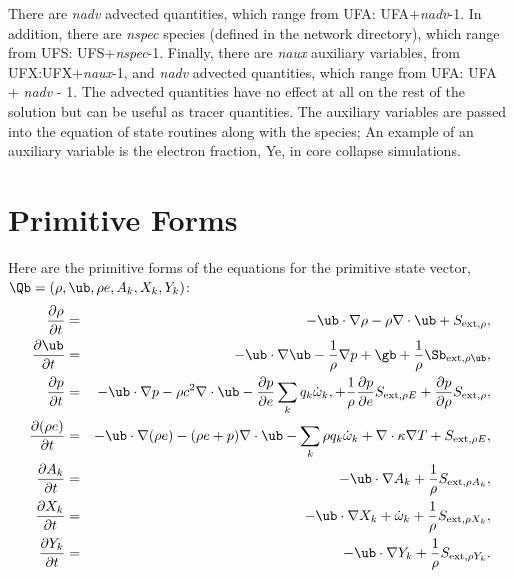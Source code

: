 There are {\it nadv} advected quantities, which range from UFA: UFA+{\it nadv}-1.
In addition, there are {\it nspec} species (defined in the network directory),  which
range from UFS: UFS+{\it nspec}-1. Finally, there are {\it naux}
auxiliary variables, from UFX:UFX+{\it naux}-1, and {\it nadv} advected
quantities, which range from UFA: UFA + {\it nadv} - 1.  
The advected quantities have no effect at all on the rest of the solution
but can be useful as tracer quantities.  The auxiliary
variables are passed into the equation of state routines along with the
species;  An example of an auxiliary variable is the electron fraction, 
Ye, in core collapse simulations.

\section{Primitive Forms}
Here are the primitive forms of the equations for the primitive state vector,
$\Qb = (\rho, \ub, \rho e, A_k, X_k, Y_k)$:
\begin{eqnarray}
\frac{\partial\rho}{\partial t} &=& -\ub\cdot\nabla\rho - \rho\nabla\cdot\ub + S_{{\rm ext},\rho}, \\
\frac{\partial\ub}{\partial t} &=& -\ub\cdot\nabla\ub - \frac{1}{\rho}\nabla p + \gb + \frac{1}{\rho}\Sb_{{\rm ext},\rho\ub}, \\
\frac{\partial p}{\partial t} &=& -\ub\cdot\nabla p - \rho c^2\nabla\cdot\ub -\frac{\partial p}{\partial e}\sum_k q_k\dot\omega_k, + \frac{1}{\rho}\frac{\partial p}{\partial e}S_{{\rm ext},\rho E} + \frac{\partial p}{\partial\rho}S_{{\rm ext},\rho}, \\
\frac{\partial(\rho e)}{\partial t} &=& - \ub\cdot\nabla(\rho e) - (\rho e+p)\nabla\cdot\ub - \sum_k \rho q_k\dot\omega_k + \nabla\cdot\kappa\nabla T + S_{{\rm ext},\rho E}, \\
\frac{\partial A_k}{\partial t} &=& -\ub\cdot\nabla A_k + \frac{1}{\rho}S_{{\rm ext},\rho A_k}, \\
\frac{\partial X_k}{\partial t} &=& -\ub\cdot\nabla X_k + \dot\omega_k + \frac{1}{\rho}S_{{\rm ext},\rho X_k}, \\
\frac{\partial Y_k}{\partial t} &=& -\ub\cdot\nabla Y_k + \frac{1}{\rho}S_{{\rm ext},\rho Y_k}.
\end{eqnarray}

